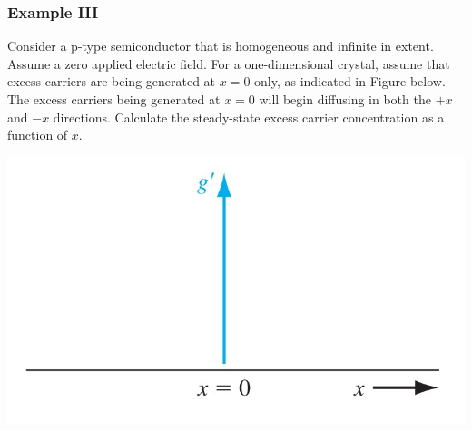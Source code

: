 \documentclass{beamer}
\begin{document}
    \begin{frame} \frametitle{Example III}
        \par Consider a p-type semiconductor that is homogeneous and infinite in extent. Assume a zero applied electric field. For a one-dimensional crystal, assume that excess carriers are being generated at $x = 0$ only, as indicated in Figure below. The excess carriers being generated at $x = 0$ will begin diffusing in both the $+x$ and $-x$ directions. Calculate the steady-state excess carrier concentration as a function of $x$. \\[2em]
        \begin{minipage}{\linewidth}
            \begin{minipage}{0.3\linewidth}
                \includegraphics[width=\linewidth]{Example-3.jpg}
            \end{minipage}
            \begin{minipage}{0.69\linewidth}
            \end{minipage}
        \end{minipage}
    \end{frame}
\end{document}
